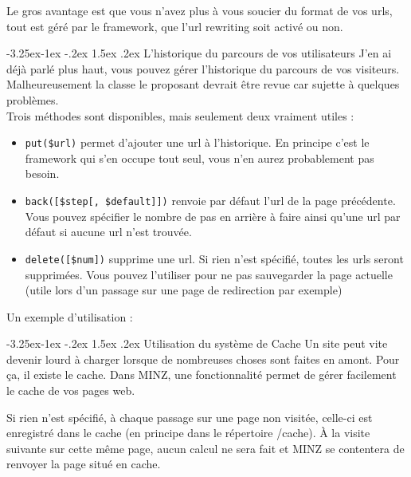\documentclass[a4paper,11pt]{article}
\makeatletter
\renewcommand{\subsection}{\@startsection{subsection}{2}{\z@}%
             {-3.25ex\@plus -1ex \@minus -.2ex}%
             {1.5ex \@plus .2ex}%
             {\color{bleuFonce}\normalfont\large\bfseries}}
\makeatother
\begin{document}
Le gros avantage est que vous n'avez plus à vous soucier du format de vos urls, tout est géré par le framework, que l'url rewriting soit activé ou non.

\subsection{L'historique du parcours de vos utilisateurs}
J'en ai déjà parlé plus haut, vous pouvez gérer l'historique du parcours de vos visiteurs. Malheureusement la classe le proposant devrait être revue car sujette à quelques problèmes.\\

Trois méthodes sont disponibles, mais seulement deux vraiment utiles :
\begin{itemize}
  \item \texttt{put(\$url)} permet d'ajouter une url à l'historique. En principe c'est le framework qui s'en occupe tout seul, vous n'en aurez probablement pas besoin.
  \item \texttt{back([\$step[, \$default]])} renvoie par défaut l'url de la page précédente. Vous pouvez spécifier le nombre de pas en arrière à faire ainsi qu'une url par défaut si aucune url n'est trouvée.
  \item \texttt{delete([\$num])} supprime une url. Si rien n'est spécifié, toutes les urls seront supprimées. Vous pouvez l'utiliser pour ne pas sauvegarder la page actuelle (utile lors d'un passage sur une page de redirection par exemple)
\end{itemize}

Un exemple d'utilisation :

\subsection{Utilisation du système de Cache}
Un site peut vite devenir lourd à charger lorsque de nombreuses choses sont faites en amont. Pour ça, il existe le cache. Dans MINZ, une fonctionnalité permet de gérer facilement le cache de vos pages web.

Si rien n'est spécifié, à chaque passage sur une page non visitée, celle-ci est enregistré dans le cache (en principe dans le répertoire /cache). À la visite suivante sur cette même page, aucun calcul ne sera fait et MINZ se contentera de renvoyer la page situé en cache.
\end{document}
